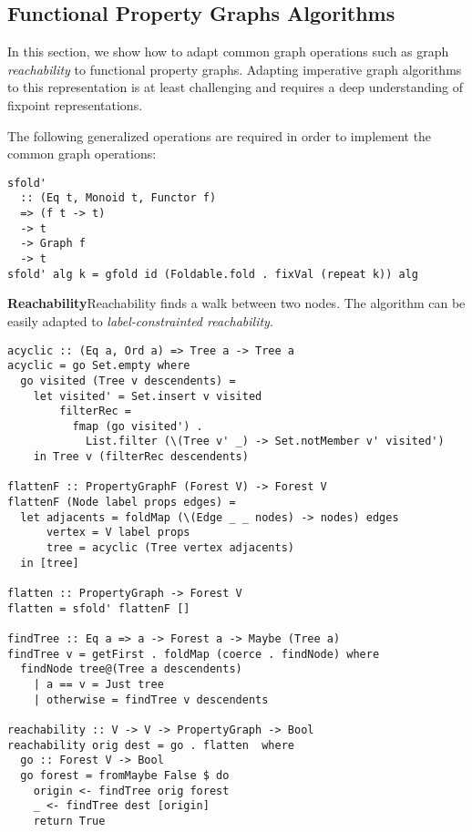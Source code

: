 \subsection{Functional Property Graphs Algorithms}
\label{subsec:algorithms}

In this section, we show how to adapt common graph operations such as graph \emph{reachability} to functional property graphs. Adapting imperative graph algorithms to this representation is at least challenging and requires a deep understanding of fixpoint representations.

The following generalized operations are required in order to implement the common graph operations:

\vspace{1mm}
\begin{verbatim}
sfold'
  :: (Eq t, Monoid t, Functor f)
  => (f t -> t)
  -> t
  -> Graph f
  -> t
sfold' alg k = gfold id (Foldable.fold . fixVal (repeat k)) alg
\end{verbatim}
\vspace{1mm}

\textbf{Reachability}\quad Reachability finds a walk between two nodes. The algorithm can be easily adapted to \emph{label-constrainted reachability}.

\vspace{1mm}
\begin{verbatim}
acyclic :: (Eq a, Ord a) => Tree a -> Tree a
acyclic = go Set.empty where
  go visited (Tree v descendents) =
    let visited' = Set.insert v visited
        filterRec =
          fmap (go visited') .
            List.filter (\(Tree v' _) -> Set.notMember v' visited')
    in Tree v (filterRec descendents)

flattenF :: PropertyGraphF (Forest V) -> Forest V
flattenF (Node label props edges) =
  let adjacents = foldMap (\(Edge _ _ nodes) -> nodes) edges
      vertex = V label props
      tree = acyclic (Tree vertex adjacents)
  in [tree]

flatten :: PropertyGraph -> Forest V
flatten = sfold' flattenF []

findTree :: Eq a => a -> Forest a -> Maybe (Tree a)
findTree v = getFirst . foldMap (coerce . findNode) where
  findNode tree@(Tree a descendents)
    | a == v = Just tree
    | otherwise = findTree v descendents

reachability :: V -> V -> PropertyGraph -> Bool
reachability orig dest = go . flatten  where
  go :: Forest V -> Bool
  go forest = fromMaybe False $ do
    origin <- findTree orig forest
    _ <- findTree dest [origin]
    return True
\end{verbatim}
\vspace{1mm}
